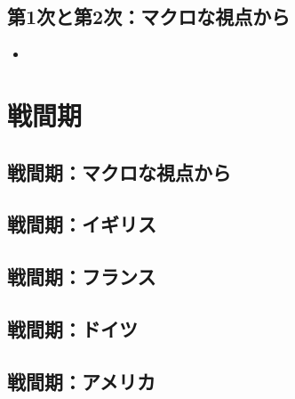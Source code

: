 \documentclass{jsarticle}
\begin{document}
\subsection{第1次と第2次：マクロな視点から}
\begin{itemize}
\item 
\end{itemize}

\section{戦間期}
\subsection{戦間期：マクロな視点から}
\subsection{戦間期：イギリス}
\subsection{戦間期：フランス}
\subsection{戦間期：ドイツ}
\subsection{戦間期：アメリカ}
\end{document}
